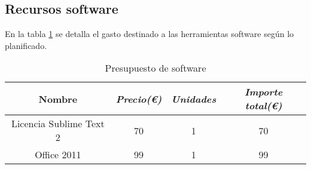 \subsection{Recursos software}

En la tabla \ref{tab:budget-software} se detalla el gasto destinado a las herramientas software según lo planificado.

\begin{table}[htp]
	\centering
	\caption{Presupuesto de software}\label{tab:budget-software}
	\begin{tabular}{cccc}
		\toprule
    	\textbf{Nombre} & \emph{Precio(\euro)} & \emph{Unidades} & \emph{Importe total(\euro)}\\
    	\midrule
    	Licencia Sublime Text 2		& 	70				&	1 			& 	70\\
    	Office 2011 				&	99				&	1			&	99\\
    	\bottomrule
    \end{tabular}
\end{table}